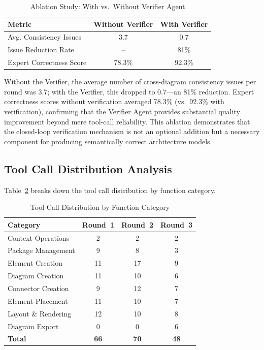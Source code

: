 \documentclass{ieeeaccess}
\begin{document}
\begin{table}[h]
\centering
\caption{Ablation Study: With vs.\ Without Verifier Agent}
\label{tab:ablation}
\begin{tabular}{lcc}
\toprule
\textbf{Metric} & \textbf{Without Verifier} & \textbf{With Verifier} \\
\midrule
Avg. Consistency Issues & 3.7 & 0.7 \\
Issue Reduction Rate & -- & 81\% \\
Expert Correctness Score & 78.3\% & 92.3\% \\
\bottomrule
\end{tabular}
\end{table}

Without the Verifier, the average number of cross-diagram consistency issues per round was 3.7; with the Verifier, this dropped to 0.7---an 81\% reduction. Expert correctness scores without verification averaged 78.3\% (vs.\ 92.3\% with verification), confirming that the Verifier Agent provides substantial quality improvement beyond mere tool-call reliability. This ablation demonstrates that the closed-loop verification mechanism is not an optional addition but a necessary component for producing semantically correct architecture models.

\subsection{Tool Call Distribution Analysis}

Table~\ref{tab:tool_distribution} breaks down the tool call distribution by function category.

\begin{table}[h]
\centering
\caption{Tool Call Distribution by Function Category}
\label{tab:tool_distribution}
\begin{tabular}{lccc}
\toprule
\textbf{Category} & \textbf{Round~1} & \textbf{Round~2} & \textbf{Round~3} \\
\midrule
Context Operations & 2 & 2 & 2 \\
Package Management & 9 & 8 & 3 \\
Element Creation & 11 & 17 & 9 \\
Diagram Creation & 11 & 10 & 6 \\
Connector Creation & 9 & 12 & 7 \\
Element Placement & 11 & 10 & 7 \\
Layout \& Rendering & 12 & 10 & 8 \\
Diagram Export & 0 & 0 & 6 \\
\midrule
\textbf{Total} & \textbf{66} & \textbf{70} & \textbf{48} \\
\bottomrule
\end{tabular}
\end{table}
\end{document}
